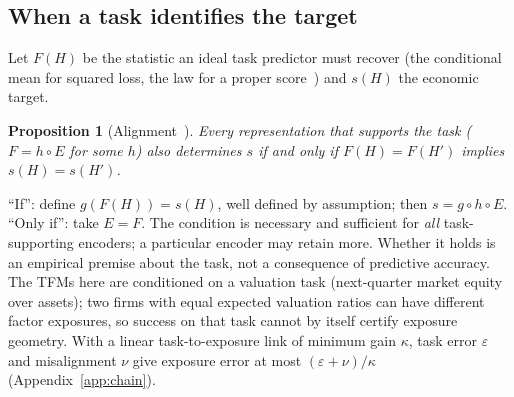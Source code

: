 \documentclass[letterpaper]{article} %
\newtheorem{proposition}{Proposition}
\theoremstyle{definition}
\begin{document}
\subsection{When a task identifies the target}
Let $F(H)$ be the statistic an ideal task predictor must recover (the
conditional mean for squared loss, the law for a proper
score~\citep{gneiting2011}) and $s(H)$ the economic target.
\begin{proposition}[Alignment~\citep{achille2018}]\label{prop:alignment}
  Every representation that supports the task ($F=h\circ E$ for some $h$) also
  determines $s$ if and only if $F(H)=F(H')$ implies $s(H)=s(H')$.
\end{proposition}
\noindent ``If'': define $g(F(H))=s(H)$, well defined by assumption; then
$s=g\circ h\circ E$. ``Only if'': take $E=F$. The condition is necessary and
sufficient for \emph{all} task-supporting encoders; a particular encoder may
retain more. Whether it holds is an empirical premise about the task, not a
consequence of predictive accuracy. The TFMs here are conditioned on a
valuation task (next-quarter market equity over assets); two firms with equal
expected valuation ratios can have different factor exposures, so success on
that task cannot by itself certify exposure geometry. With a linear
task-to-exposure link of minimum gain $\kappa$, task error $\varepsilon$ and
misalignment $\nu$ give exposure error at most $(\varepsilon+\nu)/\kappa$
(Appendix~\ref{app:chain}).
\end{document}
